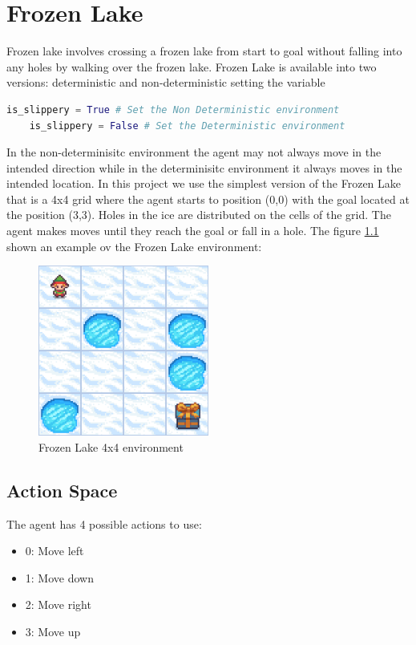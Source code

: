 \chapter{Frozen Lake}
Frozen lake involves crossing a frozen lake from start to goal without falling into any holes by walking over the frozen lake. 
Frozen Lake is available into two versions: deterministic and non-deterministic setting the variable 
\begin{lstlisting}[language=Python, caption=slippery variable]
    is_slippery = True # Set the Non Deterministic environment
    is_slippery = False # Set the Deterministic environment
\end{lstlisting}
In the non-determinisitc environment the agent may not always move in the intended direction while in the determinisitc environment it always moves in the intended location.
In this project we use the simplest version of the Frozen Lake that is a {4x4} grid where the agent starts to position (0,0) with the goal located at the position (3,3).
Holes in the ice are distributed on the cells of the grid.
The agent makes moves until they reach the goal or fall in a hole.
The figure \ref{fig:frozen_lake_environment} shown an example ov the Frozen Lake environment:
\begin{figure}[h]
    \centering
    \includegraphics[width=0.5\textwidth]{images/image.png}
    \caption{Frozen Lake 4x4 environment}
    \label{fig:frozen_lake_environment}
\end{figure}
\newpage
\section{Action Space}
The agent has 4 possible actions to use:
\begin{itemize}
    \item 0: Move left
    \item 1: Move down
    \item 2: Move right
    \item 3: Move up
\end{itemize}
